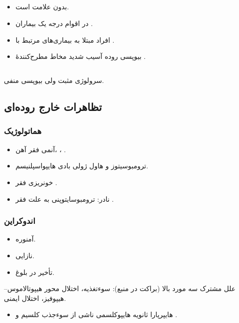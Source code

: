\documentclass[12pt,a4paper]{article}
\begin{document}
\subsection*{}
\begin{itemize}
\item بدون علامت است.
\item در اقوام درجه یک بیماران .
\item افراد مبتلا به بیماری‌های مرتبط با .
\item بیوپسی روده \CeliacArrow{} آسیب شدید مخاط مطرح‌کنندهٔ .
\end{itemize}

\subsection*{}
سرولوژی مثبت ولی بیوپسی منفی.

\subsection*{تظاهرات خارج روده‌ای }
\subsubsection*{ هماتولوژیک}
\begin{itemize}
\item آنمی \CeliacArrow{} فقر آهن، ، .
\item ترومبوسیتوز و هاول ژولی بادی \CeliacArrow{} هایپواسپلنیسم.
\item خونریزی \CeliacArrow{} فقر .
\item نادر: ترومبوسایتوپنی به علت فقر .
\end{itemize}

\subsubsection*{ اندوکراین}
\begin{itemize}
\item آمنوره.
\item نازایی.
\item تأخیر در بلوغ.
\end{itemize}
علل مشترک سه مورد بالا (براکت در منبع): سوءتغذیه، اختلال محور هیپوتالاموس–هیپوفیز، اختلال ایمنی.
\begin{itemize}
\item هایپرپارا ثانویه \CeliacArrow{} هایپوکلسمی ناشی از سوءجذب کلسیم و .
\end{itemize}
\end{document}

